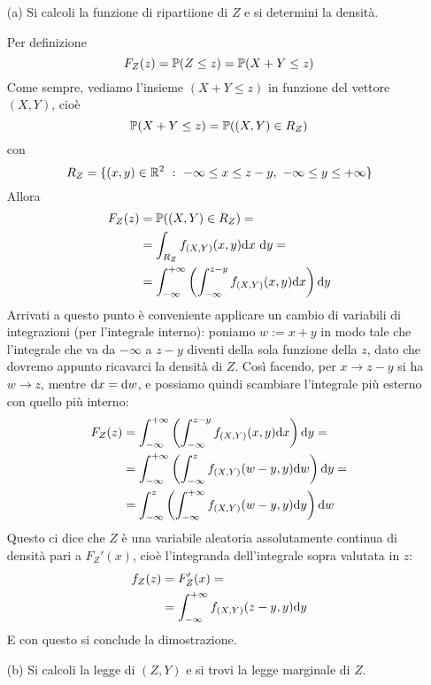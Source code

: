 \Soluzione{}
\begin{enumerate}
\item [(a)] Si calcoli la funzione di ripartiione di $Z$ e si determini la densità.

Per definizione
\[
F_Z(z)=\mathbb{P}(Z\leq z)=\mathbb{P}(X+Y\leq z)
\]
Come sempre, vediamo l'insieme $(X+Y\leq z)$ in funzione del vettore $(X,Y)$, cioè
\[
\mathbb{P}(X+Y\leq z)=\mathbb{P}((X,Y)\in R_Z)
\]
con 
\[
R_Z=\{(x,y)\in\RR^2\ :\ -\infty\leq x\leq z-y,\ -\infty\leq y\leq +\infty  \}
\]
Allora
\begin{gather*}
\begin{aligned}
F_Z(z)&=\mathbb{P}((X,Y)\in R_Z)=\\
&=\int_{R_Z}f_{(X,Y)}(x,y)\mathrm{d} x\ \mathrm{d} y =\\
&=\int_{-\infty}^{+\infty} \left(\int_{-\infty}^{z-y}f_{(X,Y)}(x,y)\mathrm{d} x   \right)\mathrm{d} y
\end{aligned}
\end{gather*}
Arrivati a questo punto è conveniente applicare un cambio di variabili di integrazioni (per l'integrale interno): poniamo $w:=x+y$ in modo tale che l'integrale che va da $-\infty$ a $z-y$ diventi della sola funzione della $z$, dato che dovremo appunto ricavarci la densità di $Z$. Così facendo, per $x\to z-y$ si ha $w\to z$, mentre $\mathrm{d} x=\mathrm{d} w$, e possiamo quindi scambiare l'integrale più esterno con quello più interno:
\begin{gather*}
\begin{aligned}
F_Z(z)&=\int_{-\infty}^{+\infty} \left(\int_{-\infty}^{z-y}f_{(X,Y)}(x,y)\mathrm{d} x   \right)\mathrm{d} y=\\
&=\int_{-\infty}^{+\infty} \left(\int_{-\infty}^{z}f_{(X,Y)}(w-y,y)\mathrm{d} w   \right)\mathrm{d} y=\\
&=\int_{-\infty}^{z}\left(\int_{-\infty}^{+\infty} f_{(X,Y)}(w-y,y)\mathrm{d} y    \right)\mathrm{d} w
\end{aligned}
\end{gather*}
Questo ci dice che $Z$ è una variabile aleatoria assolutamente continua di densità pari a $F_Z'(x)$, cioè l'integranda dell'integrale sopra valutata in $z$:
\begin{gather*}
\begin{aligned}
f_Z(z)&=F_Z'(x)=\\
&=\int_{-\infty}^{+\infty} f_{(X,Y)}(z-y,y)\mathrm{d} y
\end{aligned}
\end{gather*}
E con questo si conclude la dimostrazione.

\item [(b)] Si calcoli la legge di $(Z,Y)$ e si trovi la legge marginale di $Z$.


\end{enumerate}
